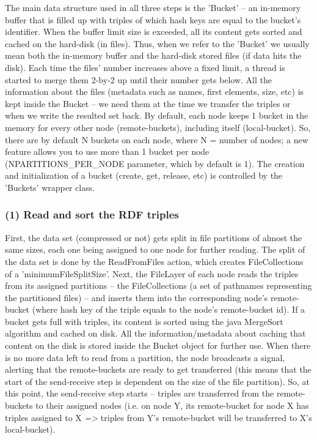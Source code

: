 The main data structure used in all three steps is the 'Bucket' -- an in-memory buffer that is filled up with triples of which hash keys are equal to the bucket's identifier. When the buffer limit size is exceeded, all its content gets sorted and cached on the hard-disk (in files). Thus, when we refer to the 'Bucket' we usually mean both the in-memory buffer and the hard-disk stored files (if data hits the disk). Each time the files' number increases above a fixed limit, a thread is started to merge them 2-by-2 up until their number gets below. All the information about the files (metadata such as names, first elements, size, etc) is kept inside the Bucket -- we need them at the time we transfer the triples or when we write the resulted set back. By default, each node keeps 1 bucket in the memory for every other node (remote-buckets), including itself (local-bucket). So, there are by default N buckets on each node, where N = number of nodes; a new feature allows you to use more than 1 bucket per node (NPARTITIONS\_PER\_NODE parameter, which by default is 1). The creation and initialization of a bucket (create, get, release, etc) is controlled by the 'Buckets' wrapper class.

% 
\subsubsection*{(1) Read and sort the RDF triples}

First, the data set (compressed or not) gets split in file partitions of almost the same sizes, each one being assigned to one node for further reading. The split of the data set is done by the ReadFromFiles action, which creates FileCollections of a 'minimumFileSplitSize'. Next, the FileLayer of each node reads the triples from its assigned partitions -- the FileCollections (a set of pathnames representing the partitioned files) -- and inserts them into the corresponding node's remote-bucket (where hash key of the triple equals to the node's remote-bucket id). If a bucket gets full with triples, its content is sorted using the java MergeSort algorithm and cached on disk. All the information/metadata about caching that content on the disk is stored inside the Bucket object for further use. When there is no more data left to read from a partition, the node broadcasts a signal, alerting that the remote-buckets are ready to get transferred (this means that the start of the send-receive step is dependent on the size of the file partition). So, at this point, the send-receive step starts -- triples are transferred from the remote-buckets to their assigned nodes (i.e. on node Y, its remote-bucket for node X has triples assigned to X \textit{=>} triples from Y's remote-bucket will be transferred to X's local-bucket).

